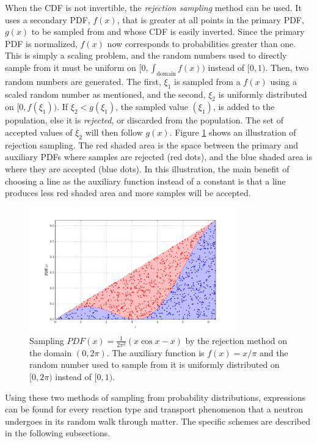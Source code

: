 When the CDF is not invertible, the \emph{rejection sampling} method can be used.  It uses a secondary PDF, $f(x)$, that is greater at all points in the primary PDF, $g(x)$ to be sampled from and whose CDF is easily inverted.  Since the primary PDF is normalized, $f(x)$ now corresponds to probabilities greater than one.  This is simply a scaling problem, and the random numbers used to directly sample from it must be uniform on $[0,\int_\mathrm{domain}f(x))$ instead of $[0,1)$.   Then, two random numbers are generated.  The first, $\xi_1$ is sampled from a $f(x)$ using a scaled random number as mentioned, and the second, $\xi_2$ is uniformly distributed on $[0,f(\xi_1))$.  If $\xi_2 < g(\xi_1)$, the sampled value $(\xi_1)$, is added to the population, else it is \emph{rejected}, or discarded from the population.  The set of accepted values of ${\xi_2}$ will then follow $g(x)$.  Figure \ref{rejection_samp} shows an illustration of rejection sampling. The red shaded area is the space between the primary and auxiliary PDFs where samples are rejected (red dots), and the blue shaded area is where they are accepted (blue dots).  In this illustration, the main benefit of choosing a line as the auxiliary function instead of a constant is that a line produces less red shaded area and more samples will be accepted.

\begin{figure}[h!] 
  \centering
    \includegraphics[width=0.8\textwidth]{graphics/rejection_samp.pdf}
     \caption{Sampling $PDF(x)=\frac{1}{2\pi^2}(x \cos x - x)$ by the rejection method on the domain $(0,2\pi)$.  The auxiliary function is $f(x)=x/\pi$ and the random number used to sample from it is uniformly distributed on $[0,2\pi)$ instead of $[0,1)$. \label{rejection_samp}}
\end{figure}

Using these two methods of sampling from probability distributions, expressions can be found for every reaction type and transport phenomenon that a neutron undergoes in its random walk through matter.  The specific schemes are described in the following subsections.

